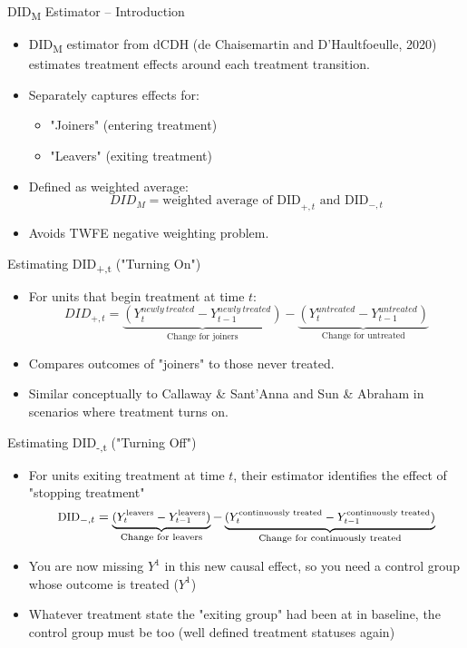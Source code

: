 \documentclass{beamer}
\begin{document}
\begin{frame}{DID\textsubscript{M} Estimator -- Introduction}
\begin{itemize}
\item DID\textsubscript{M} estimator from dCDH (de Chaisemartin and D'Haultfoeulle, 2020) estimates treatment effects around each treatment transition.
\item Separately captures effects for:
\begin{itemize}
    \item "Joiners" (entering treatment)
    \item "Leavers" (exiting treatment)
\end{itemize}
\item Defined as weighted average:
\[
DID_M = \text{weighted average of DID}_{+,t} \text{ and DID}_{-,t}
\]
\item Avoids TWFE negative weighting problem.
\end{itemize}
\end{frame}

\begin{frame}{Estimating DID\textsubscript{+,t} ("Turning On")}
\begin{itemize}
\item For units that begin treatment at time \( t \):
\[
DID_{+,t} = \underbrace{(Y_{t}^{newly\ treated} - Y_{t-1}^{newly\ treated})}_{\text{Change for joiners}} - \underbrace{(Y_{t}^{untreated} - Y_{t-1}^{untreated})}_{\text{Change for untreated}}
\]
\item Compares outcomes of "joiners" to those never treated.
\item Similar conceptually to Callaway \& Sant'Anna and Sun \& Abraham in scenarios where treatment turns on.
\end{itemize}
\end{frame}

\begin{frame}{Estimating DID\textsubscript{-,t} ("Turning Off")}
\begin{itemize}
  \item For units exiting treatment at time \( t \), their estimator identifies the effect of "stopping treatment"
  \begin{equation*}
    \small
    \text{DID}_{-,t} = 
    \underbrace{(Y_{t}^{\text{leavers}} - Y_{t-1}^{\text{leavers}})}_{\text{Change for leavers}} 
    - 
    \underbrace{(Y_{t}^{\text{continuously treated}} - Y_{t-1}^{\text{continuously treated}})}_{\text{Change for continuously treated}}
  \end{equation*}
  \item You are now missing $Y^1$ in this new causal effect, so you need a control group whose outcome is treated ($Y^1$)
  \item Whatever treatment state the "exiting group" had been at in baseline, the control group must be too (well defined treatment statuses again)
\end{itemize}
\end{frame}
\end{document}
